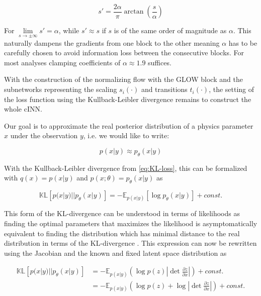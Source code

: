\begin{equation*}
	s' = \frac{2\alpha}{\pi} \arctan\left(\frac{s}{\alpha}\right)
\end{equation*}

For $\lim\limits_{s\rightarrow\pm\infty} s' = \alpha$, while $s' \approx s$ if $s$ is of the same order of magnitude as $\alpha$. This naturally dampens the gradients from one block to the other meaning $\alpha$ has to be carefully chosen to avoid information loss between the consecutive blocks. For most analyses clamping coefficients of $\alpha \approx 1.9$ suffices.

With the construction of the normalizing flow with the GLOW block and the subnetworks representing the scaling $s_i(\cdot)$ and transitions $t_i(\cdot)$, the setting of the loss function using the Kullback-Leibler divergence remains to construct the whole cINN.


Our goal is to approximate the real posterior distribution of a physics parameter $x$ under the observation $y$, i.e. we would like to write:

\begin{equation*}
	p(x | y) \approx p_\theta(x | y)
\end{equation*}

With the Kullback-Leibler divergence from \ref{eq:KL-loss}, this can be formalized with $q(x) = p(x | y)$ and $p(x; \theta) = p_\theta(x | y)$ as

\begin{equation*}
	\mathbb{KL}\left[p(x | y) || p_\theta(x | y) \right] = - \mathbb{E}_{p(x | y)} \left[ \log p_\theta(x | y)\right] + const.
\end{equation*}

This form of the KL-divergence can be understood in terms of likelihoods as finding the optimal parameters that maximizes the likelihood is asymptomatically equivalent to finding the distribution which has minimal distance to the real distribution in terms of the KL-divergence \cite{Bishop_book}. This expression can now be rewritten using the Jacobian and the known and fixed latent space distribution as

\begin{equation*}
	\begin{aligned}
		\mathbb{KL}\left[p(x | y) || p_\theta(x | y) \right] &= - \mathbb{E}_{p(x | y)}\left(\log p(z) \left|\det\frac{\partial z}{\partial x}\right|\right) + const. \\
		&= - \mathbb{E}_{p(x | y)}\left(\log p(z)  + \log \left|\det\frac{\partial z}{\partial x}\right|\right) + const.
	\end{aligned}
\end{equation*}

